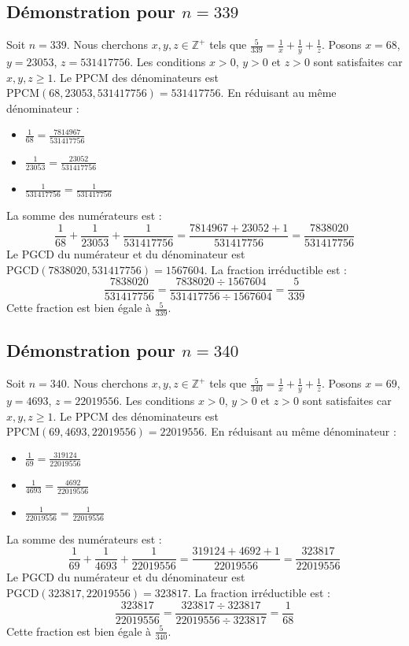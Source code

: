 \documentclass[11pt,a4paper]{article}
\begin{document}
\subsection{Démonstration pour $n = 339$}
Soit $n = 339$. Nous cherchons $x, y, z \in \mathbb{Z}^{+}$ tels que $\frac{5}{339} = \frac{1}{x} + \frac{1}{y} + \frac{1}{z}$.
Posons $x = 68$, $y = 23053$, $z = 531417756$.
Les conditions $x > 0$, $y > 0$ et $z > 0$ sont satisfaites car $x, y, z \geq 1$.
Le PPCM des dénominateurs est $\text{PPCM}(68, 23053, 531417756) = 531417756$.
En réduisant au même dénominateur :
\begin{itemize}
    \item $\frac{1}{68} = \frac{7814967}{531417756}$
    \item $\frac{1}{23053} = \frac{23052}{531417756}$
    \item $\frac{1}{531417756} = \frac{1}{531417756}$
\end{itemize}
La somme des numérateurs est :
$$ \frac{1}{68} + \frac{1}{23053} + \frac{1}{531417756} = \frac{7814967 + 23052 + 1}{531417756} = \frac{7838020}{531417756} $$
Le PGCD du numérateur et du dénominateur est $\text{PGCD}(7838020, 531417756) = 1567604$.
La fraction irréductible est :
$$ \frac{7838020}{531417756} = \frac{7838020 \div 1567604}{531417756 \div 1567604} = \frac{5}{339} $$
Cette fraction est bien égale à $\frac{5}{339}$.

\subsection{Démonstration pour $n = 340$}
Soit $n = 340$. Nous cherchons $x, y, z \in \mathbb{Z}^{+}$ tels que $\frac{5}{340} = \frac{1}{x} + \frac{1}{y} + \frac{1}{z}$.
Posons $x = 69$, $y = 4693$, $z = 22019556$.
Les conditions $x > 0$, $y > 0$ et $z > 0$ sont satisfaites car $x, y, z \geq 1$.
Le PPCM des dénominateurs est $\text{PPCM}(69, 4693, 22019556) = 22019556$.
En réduisant au même dénominateur :
\begin{itemize}
    \item $\frac{1}{69} = \frac{319124}{22019556}$
    \item $\frac{1}{4693} = \frac{4692}{22019556}$
    \item $\frac{1}{22019556} = \frac{1}{22019556}$
\end{itemize}
La somme des numérateurs est :
$$ \frac{1}{69} + \frac{1}{4693} + \frac{1}{22019556} = \frac{319124 + 4692 + 1}{22019556} = \frac{323817}{22019556} $$
Le PGCD du numérateur et du dénominateur est $\text{PGCD}(323817, 22019556) = 323817$.
La fraction irréductible est :
$$ \frac{323817}{22019556} = \frac{323817 \div 323817}{22019556 \div 323817} = \frac{1}{68} $$
Cette fraction est bien égale à $\frac{5}{340}$.
\end{document}
